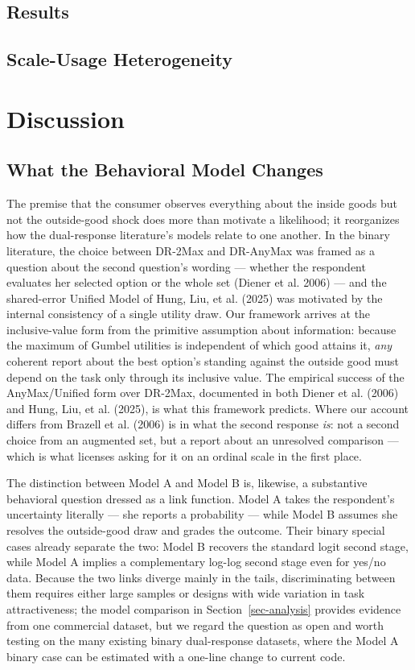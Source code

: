 \documentclass[
  letterpaper,
  DIV=11,
  numbers=noendperiod]{scrartcl}
\theoremstyle{plain}
\theoremstyle{plain}
\theoremstyle{remark}
\begin{document}
\subsection{Results}\label{sec-empirical-results}

\subsection{Scale-Usage Heterogeneity}\label{sec-empirical-hetcut}

\section{Discussion}\label{sec-discussion}

\subsection{What the Behavioral Model
Changes}\label{what-the-behavioral-model-changes}

The premise that the consumer observes everything about the inside goods
but not the outside-good shock does more than motivate a likelihood; it
reorganizes how the dual-response literature's models relate to one
another. In the binary literature, the choice between DR-2Max and
DR-AnyMax was framed as a question about the second question's wording
--- whether the respondent evaluates her selected option or the whole
set (Diener et al. 2006) --- and the shared-error Unified Model of Hung,
Liu, et al. (2025) was motivated by the internal consistency of a single
utility draw. Our framework arrives at the inclusive-value form from the
primitive assumption about information: because the maximum of Gumbel
utilities is independent of which good attains it, \emph{any} coherent
report about the best option's standing against the outside good must
depend on the task only through its inclusive value. The empirical
success of the AnyMax/Unified form over DR-2Max, documented in both
Diener et al. (2006) and Hung, Liu, et al. (2025), is what this
framework predicts. Where our account differs from Brazell et al. (2006)
is in what the second response \emph{is}: not a second choice from an
augmented set, but a report about an unresolved comparison --- which is
what licenses asking for it on an ordinal scale in the first place.

The distinction between Model A and Model B is, likewise, a substantive
behavioral question dressed as a link function. Model A takes the
respondent's uncertainty literally --- she reports a probability ---
while Model B assumes she resolves the outside-good draw and grades the
outcome. Their binary special cases already separate the two: Model B
recovers the standard logit second stage, while Model A implies a
complementary log-log second stage even for yes/no data. Because the two
links diverge mainly in the tails, discriminating between them requires
either large samples or designs with wide variation in task
attractiveness; the model comparison in Section~\ref{sec-analysis}
provides evidence from one commercial dataset, but we regard the
question as open and worth testing on the many existing binary
dual-response datasets, where the Model A binary case can be estimated
with a one-line change to current code.
\end{document}
